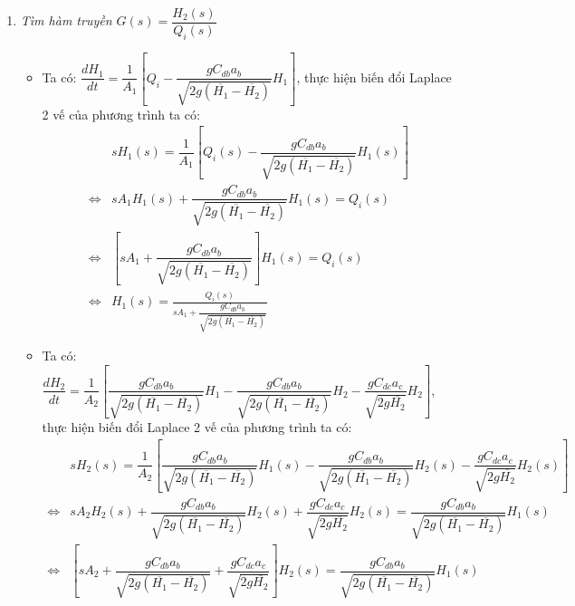 \documentclass[12pt,a4paper]{article}
\begin{document}
\begin{enumerate}[\it a.]
            \item \textit{Tìm hàm truyền $G(s) = \dfrac{H_2(s)}{Q_i(s)}$}
                \begin{itemize}
                    \item Ta có: $\dfrac{dH_1}{dt} = \dfrac{1}{A_1} \left[{Q_i - \dfrac{gC_{db}a_b}{\sqrt{2g(\overline{H_1} - \overline{H_2})}} H_1}\right]$, thực hiện biến đổi Laplace 2 vế của phương trình ta có:
                        \begin{align}
                            & s H_1(s) = \dfrac{1}{A_1} \left[{Q_i(s) - \dfrac{gC_{db}a_b}{\sqrt{2g(\overline{H_1} - \overline{H_2})}} H_1(s)}\right]\\
                            \Longleftrightarrow & s A_1 H_1(s) + \dfrac{gC_{db}a_b}{\sqrt{2g(\overline{H_1} - \overline{H_2})}} H_1(s) = Q_i(s)\\
                            \Longleftrightarrow & \left[{s A_1 + \dfrac{gC_{db}a_b}{\sqrt{2g(\overline{H_1} - \overline{H_2})}} }\right] H_1(s) = Q_i(s) \\
                            \Longleftrightarrow & H_1(s) = \frac{Q_i(s)}{s A_1 + \dfrac{gC_{db}a_b}{\sqrt{2g(\overline{H_1} - \overline{H_2})}}}
                        \end{align}
                    \item Ta có: $\dfrac{dH_2}{dt} = \dfrac{1}{A_2} \left[{\dfrac{g C_{db}a_b}{\sqrt{2g(\overline{H_1} - \overline{H_2})}} H_1 - \dfrac{g C_{db}a_b}{ \sqrt{2g(\overline{H_1} - \overline{H_2})}} H_2 - \dfrac{g C_{dc}a_c}{\sqrt{2g\overline{H_2}}} H_2 }\right]$, thực hiện biến đổi Laplace 2 vế của phương trình ta có:
                        \begin{align}
                            & s H_2(s) = \dfrac{1}{A_2} \left[{\dfrac{g C_{db}a_b}{\sqrt{2g(\overline{H_1} - \overline{H_2})}} H_1(s) - \dfrac{g C_{db}a_b}{ \sqrt{2g(\overline{H_1} - \overline{H_2})}} H_2 (s) - \dfrac{g C_{dc}a_c}{\sqrt{2g\overline{H_2}}} H_2 (s) }\right] \\
                            \Longleftrightarrow & s A_2 H_2(s) + \dfrac{g C_{db}a_b}{ \sqrt{2g(\overline{H_1} - \overline{H_2})}} H_2 (s) + \dfrac{g C_{dc}a_c}{\sqrt{2g\overline{H_2}}} H_2 (s) = \dfrac{g C_{db}a_b}{\sqrt{2g(\overline{H_1} - \overline{H_2})}} H_1(s) \\
                            \Longleftrightarrow & \left[{s A_2 + \dfrac{g C_{db}a_b}{ \sqrt{2g(\overline{H_1} - \overline{H_2})}} + \dfrac{g C_{dc}a_c}{\sqrt{2g\overline{H_2}}} }\right] H_2 (s) = \dfrac{g C_{db}a_b}{\sqrt{2g(\overline{H_1} - \overline{H_2})}} H_1(s)\\

\end{align}
\end{itemize}
\end{enumerate}
\end{document}
